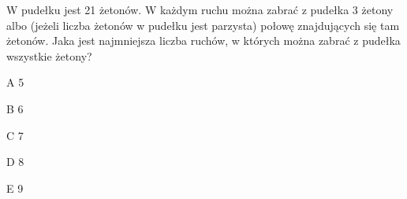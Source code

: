 \begin{tresc}
W pudełku jest 21 żetonów. W każdym ruchu można zabrać z pudełka 3 żetony albo (jeżeli liczba żetonów w pudełku jest parzysta) połowę znajdujących się tam żetonów. Jaka jest najmniejsza liczba ruchów, w których można zabrać z pudełka wszystkie żetony?
\end{tresc}
\begin{wariant}{A} 5 \end{wariant}
\begin{wariant}{B} 6 \end{wariant}
\begin{wariant}{C} 7 \end{wariant}
\begin{wariant}{D} 8 \end{wariant}
\begin{wariant}{E} 9 \end{wariant}
